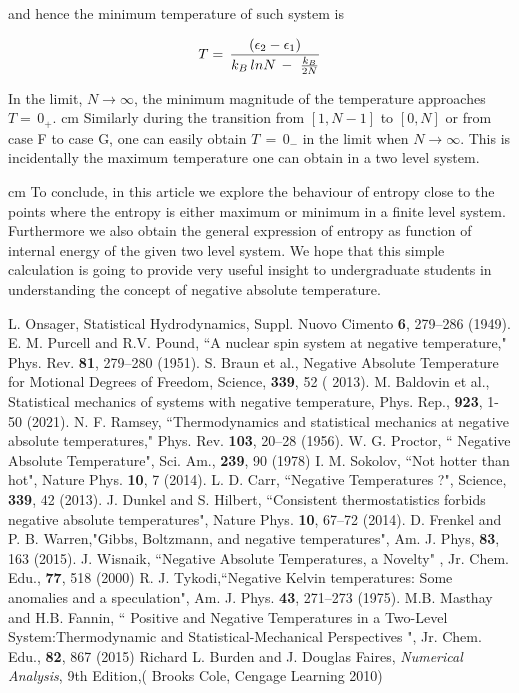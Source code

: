 \documentclass{article}
\begin{document}
and hence the minimum temperature of such system is 

$$ T = \, {{(\epsilon_2 - \epsilon_1)}  \over {k_B\, ln{N}\,-\, \,{ k_B \over 2N}}} $$


\noindent In the limit, $ N \rightarrow \infty$, the minimum  magnitude of the temperature approaches $T  =\,0_+$.
 cm
\noindent Similarly during the transition from  $[1 , N- 1 ]$ to $[0, N]$ or from case F to case G, one can easily obtain  $ T \, = \, 0_-$ in the limit when $  N \rightarrow \infty$. This is incidentally the maximum temperature one can obtain in a two level system. 


 cm
\noindent To conclude,  in this article we explore the behaviour of entropy  close to the points where the entropy is either maximum or minimum in a finite level system. Furthermore we also obtain the general expression of entropy as function of internal energy of the given two level system. We hope that this simple calculation is going to provide very useful insight to undergraduate students in understanding the concept of  negative absolute temperature. 

\begin{thebibliography}{99}

L. Onsager, Statistical Hydrodynamics, Suppl. Nuovo Cimento {\bf 6}, 279–286 (1949).
E. M. Purcell and  R.V. Pound, ``A nuclear spin system at negative temperature," Phys. Rev. {\bf 81}, 279–280 (1951).
 S. Braun et al., Negative Absolute Temperature for Motional Degrees of Freedom, Science, {\bf 339}, 52 ( 2013).
 M. Baldovin et al., Statistical mechanics of systems with negative temperature, Phys. Rep., {\bf 923}, 1-50 (2021).
 N. F. Ramsey, ``Thermodynamics and statistical mechanics at negative absolute temperatures," Phys. Rev. {\bf 103}, 20–28 (1956).
 W. G. Proctor, `` Negative Absolute Temperature", Sci. Am., {\bf 239}, 90 (1978)
 I. M. Sokolov, ``Not hotter than hot", Nature Phys. {\bf 10}, 7 (2014).
 L. D. Carr, ``Negative Temperatures ?", Science, {\bf 339}, 42 (2013).
 J. Dunkel and  S. Hilbert, ``Consistent thermostatistics forbids negative absolute temperatures",  Nature Phys. {\bf 10}, 67–72 (2014).
 D. Frenkel and  P. B. Warren,"Gibbs, Boltzmann, and negative temperatures", Am. J. Phys, {\bf 83}, 163 (2015).
 J. Wisnaik, ``Negative Absolute Temperatures, a Novelty" , Jr. Chem. Edu., {\bf 77}, 518 (2000)
 R. J. Tykodi,``Negative Kelvin temperatures: Some anomalies and a speculation", Am. J. Phys. {\bf 43}, 271–273 (1975).
 M.B. Masthay  and H.B. Fannin, `` Positive and Negative Temperatures in a Two-Level System:Thermodynamic and Statistical-Mechanical Perspectives ", Jr. Chem. Edu., {\bf 82}, 867 (2015)
 Richard L. Burden and J. Douglas Faires, {\it Numerical Analysis}, 9th Edition,( Brooks Cole, Cengage Learning 2010)
\end{thebibliography}
\end{document}
